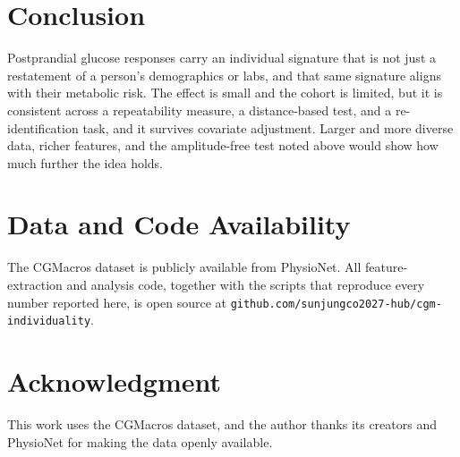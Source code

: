 \documentclass[10pt,conference,compsoc]{IEEEtran}
\begin{document}
\section{Conclusion}

Postprandial glucose responses carry an individual signature that is not just a
restatement of a person's demographics or labs, and that same signature aligns
with their metabolic risk. The effect is small and the cohort is limited, but it
is consistent across a repeatability measure, a distance-based test, and a
re-identification task, and it survives covariate adjustment. Larger and more
diverse data, richer features, and the amplitude-free test noted above would show
how much further the idea holds.

\section*{Data and Code Availability}
The CGMacros dataset is publicly available from PhysioNet. All feature-extraction
and analysis code, together with the scripts that reproduce every number reported
here, is open source at
\texttt{github.com/sunjungco2027-hub/cgm-individuality}.

\section*{Acknowledgment}
This work uses the CGMacros dataset, and the author thanks its creators and
PhysioNet for making the data openly available.

\balance
\end{document}
